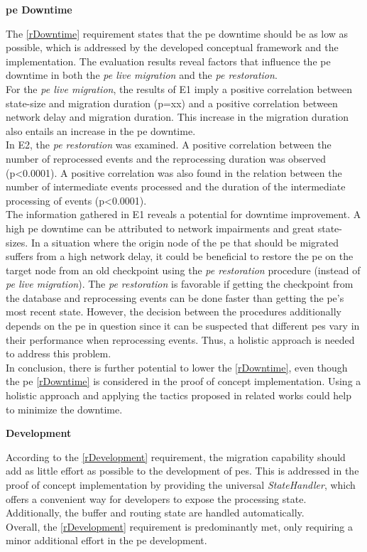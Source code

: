\textbf{\acrlong{pe} Downtime}\par
The \ref{rDowntime} requirement states that the \gls{pe} downtime should be as low as possible, which is addressed by the developed conceptual framework and the implementation. The evaluation results reveal factors that influence the \gls{pe} downtime in both the \textit{\acrshort{pe} live migration} and the \textit{\acrshort{pe} restoration}.\\
For the \textit{\acrshort{pe} live migration}, the results of E1 imply a positive correlation between state-size and migration duration (p=xx) and a positive correlation between network delay and migration duration. This increase in the migration duration also entails an increase in the \gls{pe} downtime.\\
In E2, the \textit{\acrshort{pe} restoration} was examined. A positive correlation between the number of reprocessed events and the reprocessing duration was observed (p<0.0001). A positive correlation was also found in the relation between the number of intermediate events processed and the duration of the intermediate processing of events (p<0.0001).\\
The information gathered in E1 reveals a potential for downtime improvement. A high \gls{pe} downtime can be attributed to network impairments and great state-sizes. In a situation where the origin node of the \gls{pe} that should be migrated suffers from a high network delay, it could be beneficial to restore the \gls{pe} on the target node from an old checkpoint using the \textit{\acrshort{pe} restoration} procedure (instead of \textit{\acrshort{pe} live migration}). The \textit{\acrshort{pe} restoration} is favorable if getting the checkpoint from the database and reprocessing events can be done faster than getting the \gls{pe}'s most recent state. However, the decision between the procedures additionally depends on the \gls{pe} in question since it can be suspected that different \gls{pe}s vary in their performance when reprocessing events. Thus, a holistic approach is needed to address this problem.\\
In conclusion, there is further potential to lower the \ref{rDowntime}, even though the \gls{pe} \ref{rDowntime} is considered in the proof of concept implementation. Using a holistic approach and applying the tactics proposed in related works could help to minimize the downtime.\par


\textbf{Development}\par
According to the \ref{rDevelopment} requirement, the migration capability should add as little effort as possible to the development of \gls{pe}s. This is addressed in the proof of concept implementation by providing the universal \textit{StateHandler}, which offers a convenient way for developers to expose the processing state. Additionally, the buffer and routing state are handled automatically.\\
Overall, the \ref{rDevelopment} requirement is predominantly met, only requiring a minor additional effort in the \gls{pe} development.\par


